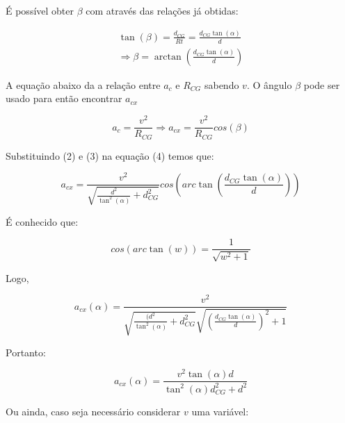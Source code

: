 \documentclass[conference,harvard,brazil,english]{sbatex}
\begin{document}
            É possível obter $\beta$ com através das relações já obtidas:
            
            \begin{eqnarray}
                \tan(\beta) = \frac{d_{CG}}{Rt} = \frac{d_{CG} \tan(\alpha)}{d} \nonumber \\
                \Rightarrow \beta = \arctan ( \frac{d_{CG} \tan (\alpha) }{d} )
            \end{eqnarray}
            
            A equação abaixo da a relação entre $a_c$ e $R_{CG}$ sabendo $v$. O ângulo $\beta$ pode ser usado para então encontrar $a_{cx}$
            
            \begin{equation}
                a_c= \frac{v^2}{R_{CG}} \Rightarrow a_{cx} = \frac{v^2}{R_{CG}}cos(\beta)
            \end{equation}
            
            Substituindo (2) e (3) na equação (4) temos que:
            
            \begin{equation}
                a_{cx} = \frac{v^2}{\sqrt{\frac{d^2}{\tan^2(\alpha)} + d_{CG}^2}}cos(arc\tan(\frac{d_{CG} \tan(\alpha)}{d}))
            \end{equation}
            
            É conhecido que:
            
            \begin{equation}
                cos(arc\tan (w)) = \frac{1}{\sqrt{w^2+1}}
            \end{equation}
            
            Logo,
            
            \begin{equation}
                a_{cx} (\alpha) = \frac{v^2}{\sqrt{\frac{(d^2}{\tan^2(\alpha)} + d_{CG}^2}   \sqrt{(\frac{d_{CG} \tan(\alpha)}{d})^2+1}}
            \end{equation}
            
            Portanto:
            
            \begin{equation}
                a_{cx} (\alpha) = \frac{v^2\tan(\alpha)d}{\tan^2(\alpha)d_{CG}^2+d^2}
            \end{equation}
            
            Ou ainda, caso seja necessário considerar $v$ uma variável:
            
\end{document}
